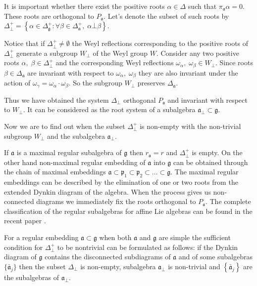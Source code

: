 \documentclass[a4paper,12pt]{article}
\theoremstyle{definition} \newtheorem{Def}{Definition}
\begin{document}
It is important whether there exist the positive roots $\alpha\in \Delta$ such that $\pi_{\mathfrak{a}}\alpha=0$. These roots are orthogonal to $P_{\mathfrak{a}}$. Let's denote the subset of such roots by $\Delta^{+}_{\bot}
=\left\{\alpha\in\Delta_{\mathfrak{g}}^{+}:
\forall \beta\in \Delta_{\mathfrak{a}}^{+},\; \alpha\bot\beta \right\}$.

Notice that if $\Delta^{+}_{\bot}\neq \emptyset$ the Weyl reflections
corresponding to the positive roots of $\Delta^{+}_{\bot}$ generate a subgroup
$W_{\bot}$ of the Weyl group $W$. Consider any two positive roots $\alpha,\;
\beta\in \Delta^{+}_{\bot}$ and the corresponding Weyl reflections
$\omega_{\alpha},\; \omega_{\beta}\in W_{\bot}$.  Since roots $\beta\in \Delta_{\mathfrak{a}}$ are invariant with respect to $\omega_{\alpha}, \; \omega_{\beta}$ they
are also invariant under the action of $\omega_{\gamma}=\omega_{\alpha}\cdot \omega_{\beta}$.
So the subgroup $W_{\bot}$ preserves $\Delta_{\mathfrak{a}}$.

Thus we have obtained the system $\Delta_{\bot}$ orthogonal $P_{\mathfrak{a}}$ and invariant with respect to  $W_{\bot}$. It
can be considered as the root system of a subalgebra $\mathfrak{a}_{\bot}\subset \mathfrak{g}$.

Now we are to find out when the subset $\Delta^{+}_{\bot}$ is non-empty with the non-trivial subgroup $W_{\bot}$ and the subalgebra $\mathfrak{a}_{\bot}$.

If $\mathfrak{a}$ is a maximal regular subalgebra of $\mathfrak{g}$ then $r_{\mathfrak{a}}=r$ and
 $\Delta^{+}_{\bot}$ is empty.
On the other hand
non-maximal regular embedding of $\mathfrak{a}$ into $\mathfrak{g}$ can be obtained
through the chain of maximal embeddings
$\mathfrak{a}\subset \mathfrak{p}_1\subset \mathfrak{p}_2\subset\dots \subset \mathfrak{g}$.
The maximal regular embeddings can be described by the elimination of one or two roots
from the extended Dynkin diagram of the algebra. When the process gives us
non-connected diagrams we immediately fix the roots orthogonal to $P_{\mathfrak{a}}$.  The complete classification of the regular subalgebras for affine Lie algebras can be found in the recent paper \cite{1751-8121-41-36-365204}.

For a regular embedding $\mathfrak{a}\subset \mathfrak{g}$ when both $\mathfrak{a}$ and $\mathfrak{g}$ are simple the sufficient condition for $\Delta^{+}_{\bot}$ to be nontrivial can be formulated as follows:
if the Dynkin diagram of $\mathfrak{g}$ contains the disconnected
subdiagrams of $\mathfrak{a}$ and of some subalgebras $\{\mathfrak{\bar{a}}_j\}$
then the subset $\Delta_{\bot}$ is non-empty,
subalgebra $\mathfrak{a}_{\bot}$ is non-trivial and
$\left\{\mathfrak{\bar{a}}_j\right\}$ are the subalgebras of $\mathfrak{a}_{\bot}$.
\end{document}
